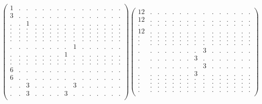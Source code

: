\documentclass[12pt,a4paper]{amsart}
\begin{document}
\begin{align*}
\left(\begin{array}{rrrrrrrrrrrrrrr}%
1&.&.&.&.&.&.&.&.&.&.&.&.&.&.\\%
3&.&.&.&.&.&.&.&.&.&.&.&.&.&.\\%
.&.&1&.&.&.&.&.&.&.&.&.&.&.&.\\%
.&.&.&.&.&.&.&.&.&.&.&.&.&.&.\\%
.&.&.&.&.&.&.&.&.&.&.&.&.&.&.\\%
.&.&.&.&.&.&.&.&.&.&.&.&.&.&.\\%
.&.&.&.&.&.&.&.&.&.&.&.&.&.&.\\%
.&.&.&.&.&.&.&.&1&.&.&.&.&.&.\\%
.&.&.&.&.&.&.&1&.&.&.&.&.&.&.\\%
.&.&.&.&.&.&.&.&.&.&.&.&.&.&.\\%
.&.&.&.&.&.&.&.&.&.&.&.&.&.&.\\%
6&.&.&.&.&.&.&.&.&.&.&.&.&.&.\\%
6&.&.&.&.&.&.&.&.&.&.&.&.&.&.\\%
.&.&3&.&.&.&.&.&3&.&.&.&.&.&.\\%
.&.&3&.&.&.&.&3&.&.&.&.&.&.&.\\%
\end{array}\right)%
\left(\begin{array}{rrrrrrrrrrrrrrr}%
12&.&.&.&.&.&.&.&.&.&.&.&.&.&.\\%
12&.&.&.&.&.&.&.&.&.&.&.&.&.&.\\%
.&.&.&.&.&.&.&.&.&.&.&.&.&.&.\\%
12&.&.&.&.&.&.&.&.&.&.&.&.&.&.\\%
.&.&.&.&.&.&.&.&.&.&.&.&.&.&.\\%
.&.&.&.&.&.&.&.&.&.&.&.&.&.&.\\%
.&.&.&.&.&.&.&.&.&.&.&.&.&.&.\\%
.&.&.&.&.&.&.&.&3&.&.&.&.&.&.\\%
.&.&.&.&.&.&.&3&.&.&.&.&.&.&.\\%
.&.&.&.&.&.&.&.&3&.&.&.&.&.&.\\%
.&.&.&.&.&.&.&3&.&.&.&.&.&.&.\\%
.&.&.&.&.&.&.&.&.&.&.&.&.&.&.\\%
.&.&.&.&.&.&.&.&.&.&.&.&.&.&.\\%
.&.&.&.&.&.&.&.&.&.&.&.&.&.&.\\%
.&.&.&.&.&.&.&.&.&.&.&.&.&.&.\\%
\end{array}\right)%
\end{align*}
\end{document}
